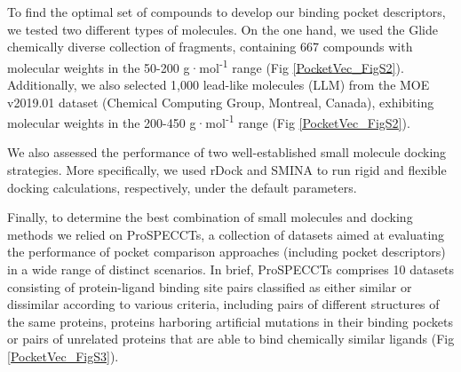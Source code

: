 To find the optimal set of compounds to develop our binding pocket descriptors, we tested two different types of molecules. On the one hand, we used the Glide chemically diverse collection of fragments\cite{friesner_glide_2004, halgren_glide_2004}, containing 667 compounds with molecular weights in the 50-200 g·mol\textsuperscript{-1} range (Fig \ref{PocketVec_FigS2}). Additionally, we also selected 1,000 lead-like molecules (LLM) from the MOE v2019.01 dataset (Chemical Computing Group, Montreal, Canada), exhibiting molecular weights in the 200-450 g·mol\textsuperscript{-1} range (Fig \ref{PocketVec_FigS2}).

We also assessed the performance of two well-established small molecule docking strategies. More specifically, we used rDock\cite{ruiz-carmona_rdock_2014} and SMINA\cite{koes_lessons_2013} to run rigid and flexible docking calculations, respectively, under the default parameters.

Finally, to determine the best combination of small molecules and docking methods we relied on ProSPECCTs, a collection of datasets aimed at evaluating the performance of pocket comparison approaches (including pocket descriptors) in a wide range of distinct scenarios\cite{ehrt_benchmark_2018}. In brief, ProSPECCTs comprises 10 datasets consisting of protein-ligand binding site pairs classified as either similar or dissimilar according to various criteria, including pairs of different structures of the same proteins, proteins harboring artificial mutations in their binding pockets or pairs of unrelated proteins that are able to bind chemically similar ligands (Fig \ref{PocketVec_FigS3}).



